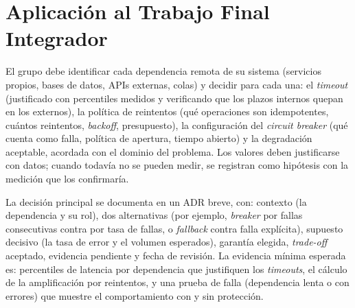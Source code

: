 \documentclass[variant=apuntes,cover=institutional,mode=screen]{ua-engineering-v6-article}
\begin{document}
\section{Aplicación al Trabajo Final Integrador}

El grupo debe identificar cada dependencia remota de su sistema (servicios propios, bases de datos, APIs externas, colas) y decidir para cada una: el \emph{timeout} (justificado con percentiles medidos y verificando que los plazos internos quepan en los externos), la política de reintentos (qué operaciones son idempotentes, cuántos reintentos, \emph{backoff}, presupuesto), la configuración del \emph{circuit breaker} (qué cuenta como falla, política de apertura, tiempo abierto) y la degradación aceptable, acordada con el dominio del problema. Los valores deben justificarse con datos; cuando todavía no se pueden medir, se registran como hipótesis con la medición que los confirmaría.

La decisión principal se documenta en un ADR breve, con: contexto (la dependencia y su rol), dos alternativas (por ejemplo, \emph{breaker} por fallas consecutivas contra por tasa de fallas, o \emph{fallback} contra falla explícita), supuesto decisivo (la tasa de error y el volumen esperados), garantía elegida, \emph{trade-off} aceptado, evidencia pendiente y fecha de revisión. La evidencia mínima esperada es: percentiles de latencia por dependencia que justifiquen los \emph{timeouts}, el cálculo de la amplificación por reintentos, y una prueba de falla (dependencia lenta o con errores) que muestre el comportamiento con y sin protección.
\end{document}
